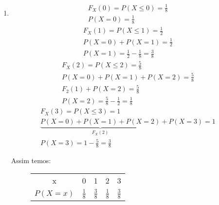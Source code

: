 \begin{example}
\begin{enumerate}[label= (\alph*)]
           \item
             \begin{align*}
               F_{X}(0)= P(X \le 0)= \frac{1}{8}\\
               P(X=0)= \frac{1}{8}
             \end{align*}
             \begin{align*}
               F_{X}(1)= P(X \le 1)= \frac{1}{2}\\
               P(X=0)+P(X=1)= \frac{1}{2} \\
               P(X=1)= \frac{1}{2}- \frac{1}{8}= \frac{3}{8}
             \end{align*}
             \begin{align*}
               F_{X}(2)= P(X \le 2)= \frac{5}{8}\\
               P(X=0)+P(X=1)+P(X=2)= \frac{5}{8}\\
               F_{2} (1) + P(X = 2 )=\frac{5}{8}\\
               P(X=2)= \frac{5}{8}- \frac{1}{2}= \frac{1}{8}
             \end{align*}
             \begin{align*}
               F_{X}(3)= P(X \le 3)= 1\\
               \underbrace{P(X=0)+ P(X=1)+ P(X=2)}_{F_{X}(2)} + P(X=3)=1\\
               P(X =3) = 1- \frac{5}{8}= \frac{3}{8}
             \end{align*}

             Assim temos:
             \begin{figure}[H]
               \centering
               \begin{tabular}{c c c c c}
                 \toprule
                 x&0&1&2&3\\ \cmidrule{2-5}
                 $P(X=x)$&$\frac{1}{8}$&$\frac{3}{8}$&$\frac{1}{8}$&$\frac{3}{8}$\\ \bottomrule
               \end{tabular}
               \label{tab:6}
             \end{figure}
         \end{enumerate}
     \end{example}     
